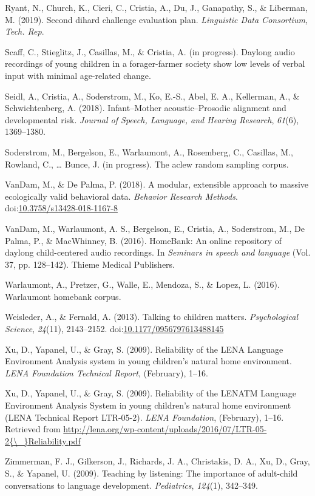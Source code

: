 \documentclass[english,floatsintext,man]{apa6}
\begin{document}
\hypertarget{ref-ryant2019second}{}
Ryant, N., Church, K., Cieri, C., Cristia, A., Du, J., Ganapathy, S., \&
Liberman, M. (2019). Second dihard challenge evaluation plan.
\emph{Linguistic Data Consortium, Tech. Rep}.

\hypertarget{ref-scaff}{}
Scaff, C., Stieglitz, J., Casillas, M., \& Cristia, A. (in progress).
Daylong audio recordings of young children in a forager-farmer society
show low levels of verbal input with minimal age-related change.

\hypertarget{ref-Seidl2018}{}
Seidl, A., Cristia, A., Soderstrom, M., Ko, E.-S., Abel, E. A.,
Kellerman, A., \& Schwichtenberg, A. (2018). Infant--Mother
acoustic--Prosodic alignment and developmental risk. \emph{Journal of
Speech, Language, and Hearing Research}, \emph{61}(6), 1369--1380.

\hypertarget{ref-soderstrom}{}
Soderstrom, M., Bergelson, E., Warlaumont, A., Rosemberg, C., Casillas,
M., Rowland, C., \ldots{} Bunce, J. (in progress). The aclew random
sampling corpus.

\hypertarget{ref-VanDam2018}{}
VanDam, M., \& De Palma, P. (2018). A modular, extensible approach to
massive ecologically valid behavioral data. \emph{Behavior Research
Methods}.
doi:\href{https://doi.org/10.3758/s13428-018-1167-8}{10.3758/s13428-018-1167-8}

\hypertarget{ref-vandam2016homebank}{}
VanDam, M., Warlaumont, A. S., Bergelson, E., Cristia, A., Soderstrom,
M., De Palma, P., \& MacWhinney, B. (2016). HomeBank: An online
repository of daylong child-centered audio recordings. In \emph{Seminars
in speech and language} (Vol. 37, pp. 128--142). Thieme Medical
Publishers.

\hypertarget{ref-warlaumont2016warlaumont}{}
Warlaumont, A., Pretzer, G., Walle, E., Mendoza, S., \& Lopez, L.
(2016). Warlaumont homebank corpus.

\hypertarget{ref-Weisleder2013a}{}
Weisleder, A., \& Fernald, A. (2013). Talking to children matters.
\emph{Psychological Science}, \emph{24}(11), 2143--2152.
doi:\href{https://doi.org/10.1177/0956797613488145}{10.1177/0956797613488145}

\hypertarget{ref-Xu2009}{}
Xu, D., Yapanel, U., \& Gray, S. (2009). Reliability of the LENA
Language Environment Analysis system in young children's natural home
environment. \emph{LENA Foundation Technical Report}, (February), 1--16.

\hypertarget{ref-Xu2009a}{}
Xu, D., Yapanel, U., \& Gray, S. (2009). Reliability of the LENATM
Language Environment Analysis System in young children's natural home
environment (LENA Technical Report LTR-05-2). \emph{LENA Foundation},
(February), 1--16. Retrieved from
\href{http://lena.org/wp-content/uploads/2016/07/LTR-05-2\%7B/_\%7DReliability.pdf}{http://lena.org/wp-content/uploads/2016/07/LTR-05-2\{\textbackslash{}\_\}Reliability.pdf}

\hypertarget{ref-zimmerman2009}{}
Zimmerman, F. J., Gilkerson, J., Richards, J. A., Christakis, D. A., Xu,
D., Gray, S., \& Yapanel, U. (2009). Teaching by listening: The
importance of adult-child conversations to language development.
\emph{Pediatrics}, \emph{124}(1), 342--349.
\end{document}
